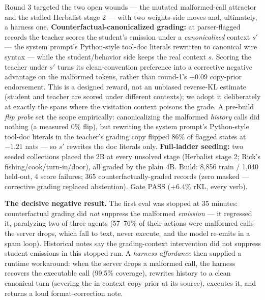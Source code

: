 \documentclass[11pt]{article}
\begin{document}
Round 3 targeted the two open wounds --- the mutated malformed-call attractor and the stalled
Herbalist stage 2 --- with two weights-side moves and, ultimately, a harness one.
\textbf{Counterfactual-canonicalized grading:} at parser-flagged records the teacher scores the
student's emission under a \emph{canonicalized} context $s'$ --- the system prompt's Python-style
tool-doc literals rewritten to canonical wire syntax --- while the student/behavior side keeps the
real context $s$. Scoring the teacher under $s'$ turns its clean-convention preference into a
corrective negative advantage on the malformed tokens, rather than round-1's $+0.09$ copy-prior
endorsement. This is a designed reward, not an unbiased reverse-KL estimate (student and teacher
are scored under different contexts); we adopt it deliberately at exactly the spans where the
visitation context poisons the grade. A pre-build \emph{flip probe} set the scope empirically:
canonicalizing the malformed \emph{history} calls did nothing (a measured $0\%$ flip), but
rewriting the system prompt's Python-style tool-doc literals in the teacher's grading copy flipped
$86\%$ of flagged states at $-1.21$ nats --- so $s'$ rewrites the doc literals only.
\textbf{Full-ladder seeding:} two seeded collections placed the 2B at every unsolved stage
(Herbalist stage 2; Rick's fishing/cook/turn-in/door), all graded by the plain 4B. Build:
8{,}856 train / 1{,}040 held-out, 4 score failures; 365 counterfactually-graded records (zero
masked --- corrective grading replaced abstention). Gate PASS ($+6.4\%$ rKL, every verb).

\textbf{The decisive negative result.} The first eval was stopped at 35 minutes:
counterfactual grading did \emph{not} suppress the malformed \emph{emission} --- it regressed it,
paralyzing two of three agents (57--76\% of their actions were malformed calls the server drops,
which fall to text, never execute, and the model re-emits in a spam loop).
Historical notes say the grading-context intervention did not suppress student emissions in this
stopped run. A \emph{harness affordance} then supplied a runtime workaround: when the server
drops a malformed call, the harness recovers the executable call (99.5\% coverage), rewrites
history to a clean canonical turn (severing the in-context copy prior at its source), executes
it, and returns a loud format-correction note.
\end{document}
